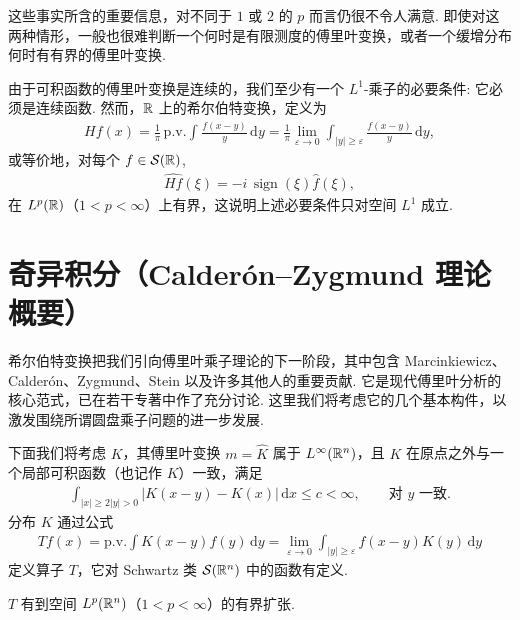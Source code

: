 这些事实所含的重要信息，对不同于 $1$ 或 $2$ 的 $p$ 而言仍很不令人满意. 即使对这两种情形，一般也很难判断一个何时是有限测度的傅里叶变换，或者一个缓增分布何时有有界的傅里叶变换.

由于可积函数的傅里叶变换是连续的，我们至少有一个 $L^{1}$-乘子的必要条件: 它必须是连续函数. 然而，$\mathbb{R}$ 上的希尔伯特变换，定义为
\begin{align*}
  H f(x)=\frac{1}{\pi}\,\mathrm{p.v.}\int_{}^{}\frac{f(x-y)}{y}\,\mathrm{d}y
  =\frac{1}{\pi}\lim_{\varepsilon\to 0}\int_{|y|\geq\varepsilon}\frac{f(x-y)}{y}\,\mathrm{d}y,
\end{align*}
或等价地，对每个 $f \in \mathcal{S}(\mathbb{R})$,
\begin{align*}
  \widehat{Hf}(\xi)=-i\,\operatorname{sign}(\xi)\widehat{f}(\xi),
\end{align*}
在 $L^p(\mathbb{R})$（$1 < p < \infty$）上有界，这说明上述必要条件只对空间 $L^1$ 成立.

\section{奇异积分（Calderón--Zygmund 理论概要）}

希尔伯特变换把我们引向傅里叶乘子理论的下一阶段，其中包含 Marcinkiewicz、Calderón、Zygmund、Stein 以及许多其他人的重要贡献. 它是现代傅里叶分析的核心范式，已在若干专著中作了充分讨论. 这里我们将考虑它的几个基本构件，以激发围绕所谓圆盘乘子问题的进一步发展.

下面我们将考虑 $K$，其傅里叶变换 $m = \widehat{K}$ 属于 $L^\infty(\mathbb{R}^n)$，且 $K$ 在原点之外与一个局部可积函数（也记作 $K$）一致，满足
\begin{align*}
  \int_{|x|\geq 2|y|>0}|K(x-y)-K(x)|\,\mathrm{d}x\leq c<\infty,\qquad \text{对 } y \text{ 一致}.
\end{align*}
分布 $K$ 通过公式
\begin{align*}
  T f(x)=\mathrm{p.v.}\int K(x-y)f(y)\,\mathrm{d}y
  =\lim_{\varepsilon\to 0}\int_{|y|\geq\varepsilon}f(x-y)K(y)\,\mathrm{d}y
\end{align*}
定义算子 $T$，它对 Schwartz 类 $\mathcal{S}(\mathbb{R}^n)$ 中的函数有定义.

\begin{theorem}\label{thm:4.5}
$T$ 有到空间 $L^p(\mathbb{R}^n)$（$1 < p < \infty$）的有界扩张.
\end{theorem}

